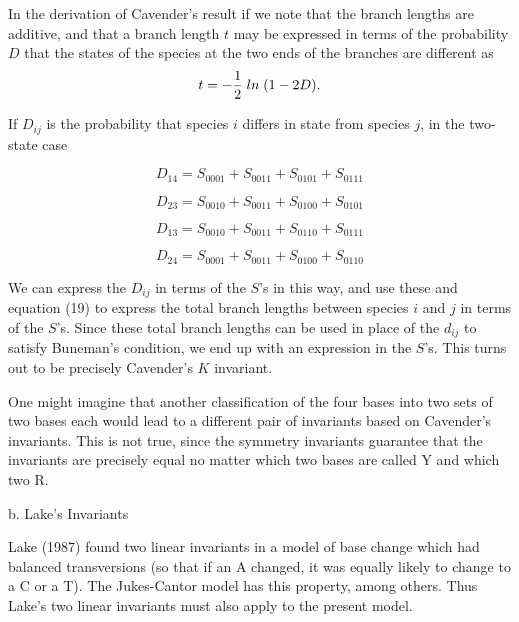 In the derivation of Cavender's result if we note that the branch lengths
are additive, and that a branch length $t$ may be expressed in terms of
the probability $D$ that the states of the species at the two ends of the
branches are different as
\begin{equation} %
   t  =  - {1 \over 2} \; ln \; (1 - 2D).
\end{equation}

If $D_{ij}$ is the probability that species $i$ differs in state from
species $j$, in the two-state case

\begin{equation} %
   D_{14} = S_{0001} + S_{0011} + S_{0101} + S_{0111}
\end{equation}

\begin{equation}
   D_{23} = S_{0010} + S_{0011} + S_{0100} + S_{0101}
\end{equation}

\begin{equation}
   D_{13} = S_{0010} + S_{0011} + S_{0110} + S_{0111}
\end{equation}

\begin{equation}
   D_{24} = S_{0001} + S_{0011} + S_{0100} + S_{0110}
\end{equation}

We can express the $D_{ij}$ in terms of the $S$'s in this way, and use
these and equation (19) to express the total branch lengths between species $i$
and $j$ in terms of the $S$'s.  Since these total branch lengths can be used
in place of the $d_{ij}$ to satisfy Buneman's condition, we end up with an
expression in the $S$'s.  This turns out to be precisely Cavender's $K$ 
invariant.

One might imagine that another classification of the four bases into two
sets of two bases each would lead to a different pair of invariants based on
Cavender's invariants.  This is not true, since the symmetry invariants
guarantee that the invariants are precisely equal no matter which two bases
are called Y and which two R.

\bigskip

b. Lake's Invariants
\medskip
         
Lake (1987) found two linear invariants in a model of base change which had
balanced transversions (so that if an A changed, it was equally likely to
change to a C or a T).  The Jukes-Cantor model has this property, among
others.  Thus Lake's two linear invariants must also
apply to the present model.

